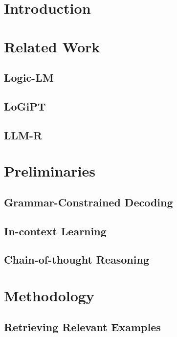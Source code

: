 \documentclass[conference]{IEEEtran}
\begin{document}
\begin{IEEEkeywords}
\end{IEEEkeywords}

\section{Introduction}

\section{Related Work}
\subsection{Logic-LM}

\subsection{LoGiPT}

\subsection{LLM-R}

\section{Preliminaries}
\subsection{Grammar-Constrained Decoding}

\subsection{In-context Learning}

\subsection{Chain-of-thought Reasoning}

\section{Methodology}

\subsection{Retrieving Relevant Examples}
\end{document}
